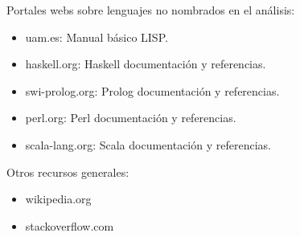 Portales webs sobre lenguajes no nombrados en el análisis:
\begin{itemize}
\item uam.es: Manual básico LISP.
\item haskell.org: Haskell documentación y referencias.
\item swi-prolog.org: Prolog documentación y referencias.
\item perl.org: Perl documentación y referencias.
\item scala-lang.org: Scala documentación y referencias.
\end{itemize}

Otros recursos generales:
\begin{itemize}
\item wikipedia.org
\item stackoverflow.com
\end{itemize}
